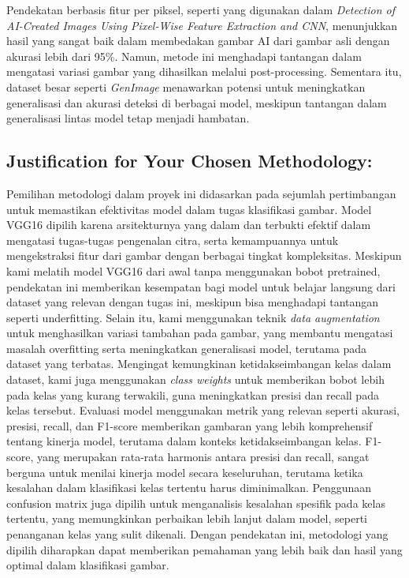 \documentclass[12pt,a4paper]{article}
\begin{document}
Pendekatan berbasis fitur per piksel, seperti yang digunakan dalam \textit{Detection of AI-Created Images Using Pixel-Wise Feature Extraction and CNN}, menunjukkan hasil yang sangat baik dalam membedakan gambar AI dari gambar asli dengan akurasi lebih dari 95\%. Namun, metode ini menghadapi tantangan dalam mengatasi variasi gambar yang dihasilkan melalui post-processing. Sementara itu, dataset besar seperti \textit{GenImage} menawarkan potensi untuk meningkatkan generalisasi dan akurasi deteksi di berbagai model, meskipun tantangan dalam generalisasi lintas model tetap menjadi hambatan.

\subsection{Justification for Your Chosen Methodology:}

Pemilihan metodologi dalam proyek ini didasarkan pada sejumlah pertimbangan untuk memastikan efektivitas model dalam tugas klasifikasi gambar. Model VGG16 dipilih karena arsitekturnya yang dalam dan terbukti efektif dalam mengatasi tugas-tugas pengenalan citra, serta kemampuannya untuk mengekstraksi fitur dari gambar dengan berbagai tingkat kompleksitas. Meskipun kami melatih model VGG16 dari awal tanpa menggunakan bobot pretrained, pendekatan ini memberikan kesempatan bagi model untuk belajar langsung dari dataset yang relevan dengan tugas ini, meskipun bisa menghadapi tantangan seperti underfitting. Selain itu, kami menggunakan teknik \textit{data augmentation} untuk menghasilkan variasi tambahan pada gambar, yang membantu mengatasi masalah overfitting serta meningkatkan generalisasi model, terutama pada dataset yang terbatas. Mengingat kemungkinan ketidakseimbangan kelas dalam dataset, kami juga menggunakan \textit{class weights} untuk memberikan bobot lebih pada kelas yang kurang terwakili, guna meningkatkan presisi dan recall pada kelas tersebut. Evaluasi model menggunakan metrik yang relevan seperti akurasi, presisi, recall, dan F1-score memberikan gambaran yang lebih komprehensif tentang kinerja model, terutama dalam konteks ketidakseimbangan kelas. F1-score, yang merupakan rata-rata harmonis antara presisi dan recall, sangat berguna untuk menilai kinerja model secara keseluruhan, terutama ketika kesalahan dalam klasifikasi kelas tertentu harus diminimalkan. Penggunaan confusion matrix juga dipilih untuk menganalisis kesalahan spesifik pada kelas tertentu, yang memungkinkan perbaikan lebih lanjut dalam model, seperti penanganan kelas yang sulit dikenali. Dengan pendekatan ini, metodologi yang dipilih diharapkan dapat memberikan pemahaman yang lebih baik dan hasil yang optimal dalam klasifikasi gambar.
\end{document}
